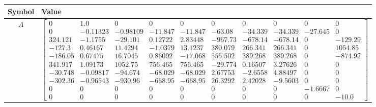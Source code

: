 \begin{tabular}{cl}
\hline
  Symbol  & Value                                                                                                                                                                                                                                                                                                                                                                                                                                                                                                                                                                                                                                                                                                                                                                                                                         \\
\hline
   $A$    & $\left[\begin{matrix}0 & 1.0 & 0 & 0 & 0 & 0 & 0 & 0 & 0 & 0\\0 & -0.11323 & -0.98109 & -11.847 & -11.847 & -63.08 & -34.339 & -34.339 & -27.645 & 0\\324.121 & -1.1755 & -29.101 & 0.12722 & 2.83448 & -967.73 & -678.14 & -678.14 & 0 & -129.29\\-127.3 & 0.46167 & 11.4294 & -1.0379 & 13.1237 & 380.079 & 266.341 & 266.341 & 0 & 1054.85\\-186.05 & 0.67475 & 16.7045 & 0.86092 & -17.068 & 555.502 & 389.268 & 389.268 & 0 & -874.92\\341.917 & 1.09173 & 1052.75 & 756.465 & 756.465 & -29.774 & 0.16507 & 3.27626 & 0 & 0\\-30.748 & -0.09817 & -94.674 & -68.029 & -68.029 & 2.67753 & -2.6558 & 4.88497 & 0 & 0\\-302.36 & -0.96543 & -930.96 & -668.95 & -668.95 & 26.3292 & 2.42028 & -9.5603 & 0 & 0\\0 & 0 & 0 & 0 & 0 & 0 & 0 & 0 & -1.6667 & 0\\0 & 0 & 0 & 0 & 0 & 0 & 0 & 0 & 0 & -10.0\end{matrix}\right]$ \\

\end{tabular}

